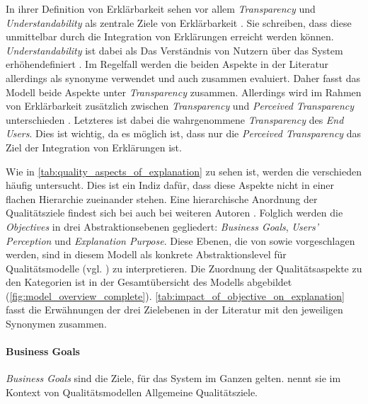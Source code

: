 In ihrer Definition von Erklärbarkeit sehen \citeauthor{chazette_knowledge_nodate} vor allem \textit{Transparency} und \textit{Understandability} als zentrale Ziele von Erklärbarkeit \cite{chazette_end-users_nodate}. Sie schreiben, dass diese unmittelbar durch die Integration von Erklärungen erreicht werden können. \textit{Understandability} ist dabei als \glqq Das Verständnis von Nutzern über das System erhöhen\grqq definiert \cite[vgl.][]{chazette_end-users_nodate}. Im Regelfall werden die beiden Aspekte in der Literatur allerdings als synonyme verwendet \cite{nunes_systematic_2017, carvalho2017quality,tintarev_designing_nodate} und auch zusammen evaluiert. Daher fasst das Modell beide Aspekte unter \textit{Transparency} zusammen. Allerdings wird im Rahmen von Erklärbarkeit zusätzlich zwischen \textit{Transparency} und \textit{Perceived Transparency} unterschieden \cite{nunes_systematic_2017}. Letzteres ist dabei die wahrgenommene \textit{Transparency} des \textit{End Users}. Dies ist wichtig, da es möglich ist, dass nur die \textit{Perceived Transparency} das Ziel der Integration von Erklärungen ist.

Wie in \autoref{tab:quality_aspects_of_explanation} zu sehen ist, werden die verschieden häufig untersucht.  Dies ist ein Indiz dafür, dass diese Aspekte nicht in einer flachen Hierarchie zueinander stehen. Eine hierarchische Anordnung der Qualitätsziele findest sich bei auch bei weiteren Autoren \cite{nunes_systematic_2017,tintarev2007survey}. Folglich werden die \textit{Objectives} in drei Abstraktionsebenen gegliedert: \textit{Business Goals}, \textit{Users' Perception} und \textit{Explanation Purpose}. Diese Ebenen, die von \citeauthor{nunes_systematic_2017} sowie \citeauthor{tintarev2007survey} vorgeschlagen werden, sind in diesem Modell als konkrete Abstraktionslevel für Qualitätsmodelle (vgl. \cite{schneider2012abenteuer}) zu interpretieren. Die Zuordnung der Qualitätsaspekte zu den Kategorien ist in der Gesamtübersicht des Modells abgebildet (\autoref{fig:model_overview_complete}). \autoref{tab:impact_of_objective_on_explanation} fasst die Erwähnungen der drei Zielebenen in der Literatur mit den jeweiligen Synonymen zusammen.

\paragraph{Business Goals} \textit{Business Goals} sind die Ziele, für das System im Ganzen gelten. \citeauthor{schneider2012abenteuer} nennt sie im Kontext von Qualitätsmodellen \glqq Allgemeine Qualitätsziele\grqq \cite{schneider2012abenteuer}.

